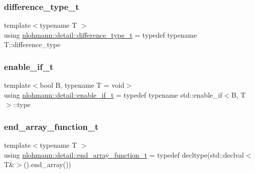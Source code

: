 \mbox{\label{namespacenlohmann_1_1detail_a3603b59a17d1c5e15050743b847992f2}} 
\subsubsection{\texorpdfstring{difference\+\_\+type\+\_\+t}{difference\_type\_t}}
{\footnotesize\ttfamily template$<$typename T $>$ \\
using \hyperlink{namespacenlohmann_1_1detail_a3603b59a17d1c5e15050743b847992f2}{nlohmann\+::detail\+::difference\+\_\+type\+\_\+t} = typedef typename T\+::difference\+\_\+type}

\mbox{\label{namespacenlohmann_1_1detail_a02bcbc878bee413f25b985ada771aa9c}} 
\subsubsection{\texorpdfstring{enable\+\_\+if\+\_\+t}{enable\_if\_t}}
{\footnotesize\ttfamily template$<$bool B, typename T  = void$>$ \\
using \hyperlink{namespacenlohmann_1_1detail_a02bcbc878bee413f25b985ada771aa9c}{nlohmann\+::detail\+::enable\+\_\+if\+\_\+t} = typedef typename std\+::enable\+\_\+if$<$B, T$>$\+::type}

\mbox{\label{namespacenlohmann_1_1detail_aec53c029383b34a72182210e58fadb79}} 
\subsubsection{\texorpdfstring{end\+\_\+array\+\_\+function\+\_\+t}{end\_array\_function\_t}}
{\footnotesize\ttfamily template$<$typename T $>$ \\
using \hyperlink{namespacenlohmann_1_1detail_aec53c029383b34a72182210e58fadb79}{nlohmann\+::detail\+::end\+\_\+array\+\_\+function\+\_\+t} = typedef decltype(std\+::declval$<$T\&$>$().end\+\_\+array())}

